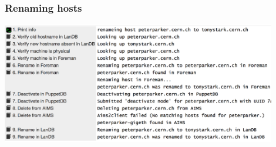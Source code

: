 \documentclass[aspectratio=169]{beamer}
\begin{document}
\begin{frame}
    \frametitle{Renaming hosts}
    \begin{center}
        \includegraphics[width=0.9\textwidth]{RunDeck_rename.png}
    \end{center}
\end{frame}

\end{document}
